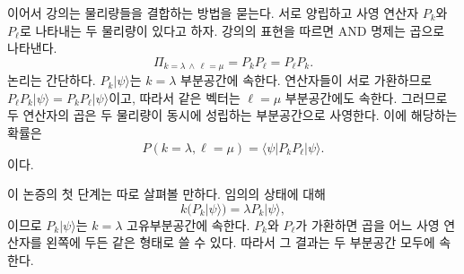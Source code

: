 \begin{classroomqa}\end{classroomqa}

\begin{classroomqa}\end{classroomqa}

\begin{classroomqa}\end{classroomqa}

이어서 강의는 물리량들을 결합하는 방법을 묻는다. 서로 양립하고 사영 연산자 \(P_k\)와 \(P_\ell\)로 나타내는 두 물리량이 있다고 하자. 강의의 표현을 따르면 AND 명제는 곱으로 나타낸다. \begin{equation}
\Pi_{k=\lambda\,\wedge\,\ell=\mu}=P_kP_\ell=P_\ell P_k.
\end{equation} 논리는 간단하다. \(P_k|\psi\rangle\)는 \(k=\lambda\) 부분공간에 속한다. 연산자들이 서로 가환하므로 \(P_\ell P_k|\psi\rangle=P_kP_\ell|\psi\rangle\)이고, 따라서 같은 벡터는 \(\ell=\mu\) 부분공간에도 속한다. 그러므로 두 연산자의 곱은 두 물리량이 동시에 성립하는 부분공간으로 사영한다. 이에 해당하는 확률은 \begin{equation}
P(k=\lambda,\ell=\mu)=\langle\psi|P_kP_\ell|\psi\rangle.
\end{equation}이다.

이 논증의 첫 단계는 따로 살펴볼 만하다. 임의의 상태에 대해 \begin{equation}
k\bigl(P_k|\psi\rangle\bigr)=\lambda P_k|\psi\rangle,
\end{equation}이므로 \(P_k|\psi\rangle\)는 \(k=\lambda\) 고유부분공간에 속한다. \(P_k\)와 \(P_\ell\)가 가환하면 곱을 어느 사영 연산자를 왼쪽에 두든 같은 형태로 쓸 수 있다. 따라서 그 결과는 두 부분공간 모두에 속한다.

